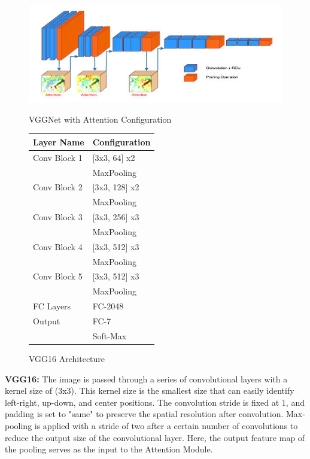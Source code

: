 \documentclass[pdflatex,sn-mathphys-num]{sn-jnl}%
\theoremstyle{thmstyleone}%
\theoremstyle{thmstyletwo}%
\theoremstyle{thmstylethree}%
\begin{document}
\begin{figure}[ht]  
    \centering  
    \begin{minipage}{0.6\textwidth}  
        \centering  
        \includegraphics[width=\textwidth]{Figures/vgg_config.jpg}  
        \caption{VGGNet with Attention Configuration}  
        \label{fig:hinh-anh-9}  
    \end{minipage}%
    \begin{minipage}{0.4\textwidth}  
        \centering  
        \small %
        \begin{tabular}{@{}ll@{}}  
            \toprule  
            \textbf{Layer Name} & \textbf{Configuration} \\ \midrule  
            Conv Block 1 & [3x3, 64] x2 \\
            & MaxPooling \\ \midrule  
            Conv Block 2 & [3x3, 128] x2 \\
            & MaxPooling \\ \midrule  
            Conv Block 3 & [3x3, 256] x3 \\
            & MaxPooling \\ \midrule  
            Conv Block 4 & [3x3, 512] x3 \\
            & MaxPooling \\ \midrule  
            Conv Block 5 & [3x3, 512] x3 \\
            & MaxPooling \\ \midrule  
            FC Layers & FC-2048 \\ \midrule  
            Output & FC-7 \\
            & Soft-Max \\ \bottomrule  
        \end{tabular}  
        \caption{VGG16 Architecture}  
    \end{minipage}  
\end{figure} 
\textbf{VGG16:} The image is passed through a series of convolutional layers with a kernel size of (3x3). This kernel size is the smallest size that can easily identify left-right, up-down, and center positions. The convolution stride is fixed at 1, and padding is set to "same" to preserve the spatial resolution after convolution. Max-pooling is applied with a stride of two after a certain number of convolutions to reduce the output size of the convolutional layer. Here, the output feature map of the pooling serves as the input to the Attention Module.
\end{document}
